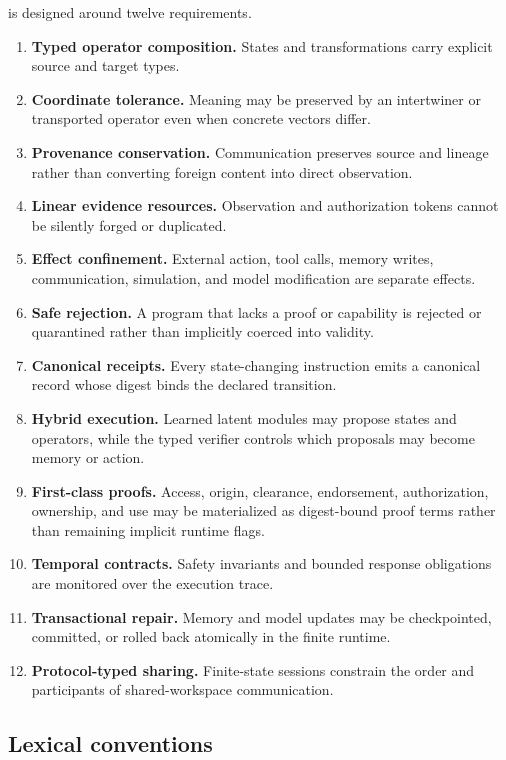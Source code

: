 \OSLCore is designed around twelve requirements.
\begin{enumerate}[leftmargin=1.7em]
  \item \textbf{Typed operator composition.}  States and transformations carry
  explicit source and target types.
  \item \textbf{Coordinate tolerance.}  Meaning may be preserved by an
  intertwiner or transported operator even when concrete vectors differ.
  \item \textbf{Provenance conservation.}  Communication preserves source and
  lineage rather than converting foreign content into direct observation.
  \item \textbf{Linear evidence resources.}  Observation and authorization
  tokens cannot be silently forged or duplicated.
  \item \textbf{Effect confinement.}  External action, tool calls, memory
  writes, communication, simulation, and model modification are separate
  effects.
  \item \textbf{Safe rejection.}  A program that lacks a proof or capability is
  rejected or quarantined rather than implicitly coerced into validity.
  \item \textbf{Canonical receipts.}  Every state-changing instruction emits a
  canonical record whose digest binds the declared transition.
  \item \textbf{Hybrid execution.}  Learned latent modules may propose states
  and operators, while the typed verifier controls which proposals may become
  memory or action.
  \item \textbf{First-class proofs.}  Access, origin, clearance, endorsement,
  authorization, ownership, and use may be materialized as digest-bound proof
  terms rather than remaining implicit runtime flags.
  \item \textbf{Temporal contracts.}  Safety invariants and bounded response
  obligations are monitored over the execution trace.
  \item \textbf{Transactional repair.}  Memory and model updates may be
  checkpointed, committed, or rolled back atomically in the finite runtime.
  \item \textbf{Protocol-typed sharing.}  Finite-state sessions constrain the
  order and participants of shared-workspace communication.
\end{enumerate}

\subsection{Lexical conventions}

